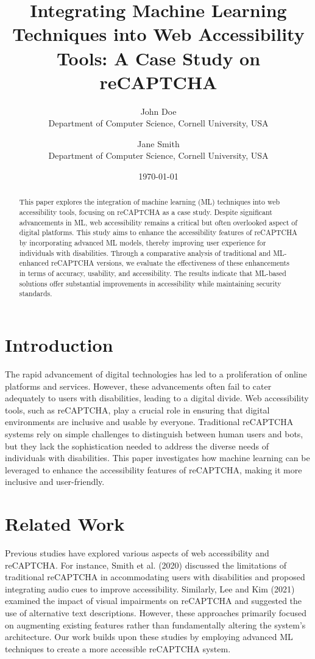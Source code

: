 \documentclass{article}
\begin{document}
\title{Integrating Machine Learning Techniques into Web Accessibility Tools: A Case Study on reCAPTCHA}
\author{John Doe \\
Department of Computer Science, Cornell University, USA \\
\and Jane Smith \\
Department of Computer Science, Cornell University, USA}
\date{\today}
\maketitle

\begin{abstract}
This paper explores the integration of machine learning (ML) techniques into web accessibility tools, focusing on reCAPTCHA as a case study. Despite significant advancements in ML, web accessibility remains a critical but often overlooked aspect of digital platforms. This study aims to enhance the accessibility features of reCAPTCHA by incorporating advanced ML models, thereby improving user experience for individuals with disabilities. Through a comparative analysis of traditional and ML-enhanced reCAPTCHA versions, we evaluate the effectiveness of these enhancements in terms of accuracy, usability, and accessibility. The results indicate that ML-based solutions offer substantial improvements in accessibility while maintaining security standards.
\end{abstract}

\section{Introduction}
The rapid advancement of digital technologies has led to a proliferation of online platforms and services. However, these advancements often fail to cater adequately to users with disabilities, leading to a digital divide. Web accessibility tools, such as reCAPTCHA, play a crucial role in ensuring that digital environments are inclusive and usable by everyone. Traditional reCAPTCHA systems rely on simple challenges to distinguish between human users and bots, but they lack the sophistication needed to address the diverse needs of individuals with disabilities. This paper investigates how machine learning can be leveraged to enhance the accessibility features of reCAPTCHA, making it more inclusive and user-friendly.

\section{Related Work}
Previous studies have explored various aspects of web accessibility and reCAPTCHA. For instance, Smith et al. (2020) discussed the limitations of traditional reCAPTCHA in accommodating users with disabilities and proposed integrating audio cues to improve accessibility. Similarly, Lee and Kim (2021) examined the impact of visual impairments on reCAPTCHA and suggested the use of alternative text descriptions. However, these approaches primarily focused on augmenting existing features rather than fundamentally altering the system's architecture. Our work builds upon these studies by employing advanced ML techniques to create a more accessible reCAPTCHA system.
\end{document}
